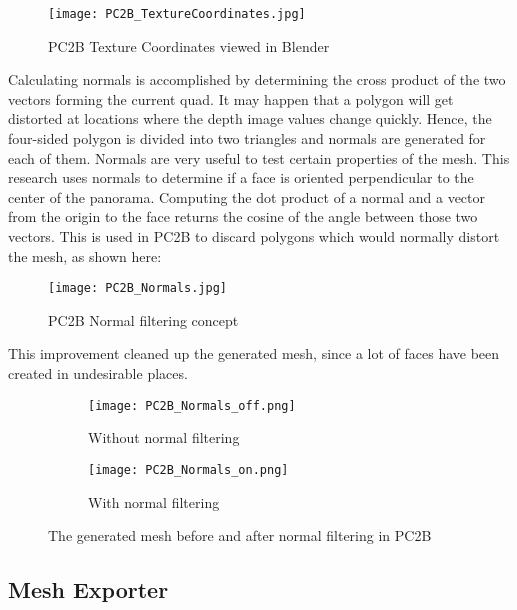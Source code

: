 \begin{figure}[h]
	\centering
	\texttt{[image: PC2B\_TextureCoordinates.jpg]}
	\caption{PC2B Texture Coordinates viewed in Blender}
	\label{fig:pc2b_texture_coordinates}
\end{figure}

\pagebreak

Calculating normals is accomplished by determining the cross product of the two vectors forming the current quad. It may happen that a polygon will get distorted at locations where the depth image values change quickly. Hence, the four-sided polygon is divided into two triangles and normals are generated for each of them. Normals are very useful to test certain properties of the mesh. This research uses normals to determine if a face is oriented perpendicular to the center of the panorama. Computing the dot product of a normal and a vector from the origin to the face returns the cosine of the angle between those two vectors. This is used in PC2B to discard polygons which would normally distort the mesh, as shown here:

\begin{figure}[h]
	\centering
	\texttt{[image: PC2B\_Normals.jpg]}
	\caption{PC2B Normal filtering concept}
	\label{fig:pc2b_normals}
\end{figure}

This improvement cleaned up the generated mesh, since a lot of faces have been created in undesirable places.


\begin{figure}[h]
	\centering
	\begin{subfigure}[b]{0.45\textwidth}
		\centering
		\texttt{[image: PC2B\_Normals\_off.png]}
		\caption{Without normal filtering}
		\label{fig:PC2B_normals_off}
	\end{subfigure}
	\hfill
	\begin{subfigure}[b]{0.45\textwidth}
		\centering
		\texttt{[image: PC2B\_Normals\_on.png]}
		\caption{With normal filtering}
		\label{fig:PC2B_normals_on}
	\end{subfigure}
	\caption{The generated mesh before and after normal filtering in PC2B}
	\label{fig:PC2B_normal_filtering}
\end{figure}


\subsection{Mesh Exporter}

